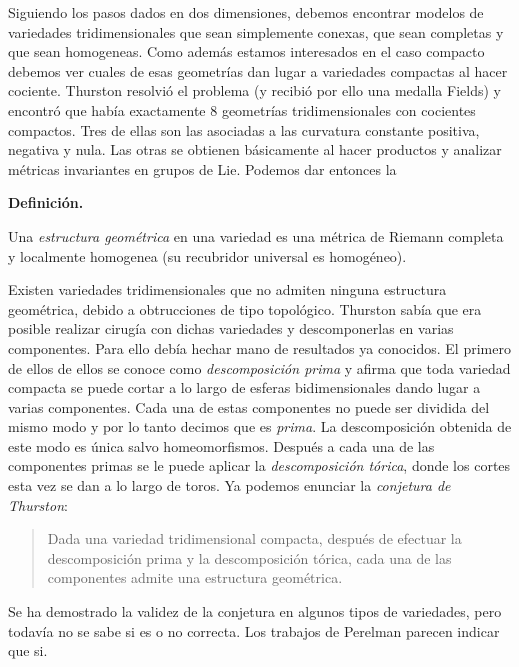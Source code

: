 \documentclass[a4paper, 12pt]{article}
\begin{document}
Siguiendo los pasos dados en dos dimensiones, debemos encontrar modelos de variedades tridimensionales que sean simplemente conexas, que sean completas y que sean homogeneas.  Como además estamos interesados en el caso compacto debemos ver cuales de esas geometrías dan lugar a variedades compactas al hacer cociente.  Thurston resolvió el problema (y recibió por ello una medalla Fields) y encontró que había exactamente 8 geometrías tridimensionales con cocientes compactos.  Tres de ellas son las asociadas a las curvatura constante positiva, negativa y nula. Las otras se obtienen básicamente al hacer productos y analizar métricas invariantes en grupos de Lie. Podemos dar entonces la 


\smallskip

{\bf Definición.} \begin{it}
Una {\it estructura geométrica} en una variedad es una métrica de Riemann completa y localmente homogenea (su recubridor universal es homogéneo).
\end{it}

\smallskip


Existen variedades tridimensionales que no admiten ninguna estructura geométrica, debido a obtrucciones de tipo topológico.  Thurston sabía que era posible realizar cirugía con dichas variedades y descomponerlas en varias componentes.   Para ello debía hechar mano de resultados ya conocidos.  El primero de ellos de ellos se conoce como {\it descomposición prima} y afirma que toda variedad compacta se puede cortar a lo largo de esferas bidimensionales dando lugar a varias componentes.  Cada una de estas componentes no puede ser dividida del mismo modo y por lo tanto decimos que es {\it prima}. La descomposición obtenida de este modo es única salvo homeomorfismos.  Después a cada una de las componentes primas se le puede aplicar la {\it descomposición tórica}, donde los cortes esta vez se dan a lo largo de toros. Ya podemos enunciar la {\it conjetura de Thurston}:

\begin{quote} \it

Dada una variedad tridimensional compacta, después de efectuar la descomposición prima y la descomposición tórica, cada una de las componentes admite una estructura geométrica.

\end{quote}


Se ha demostrado la validez de la conjetura en algunos tipos de variedades, pero todavía no se sabe si es o no correcta.  Los trabajos de Perelman parecen indicar que si.
\end{document}
